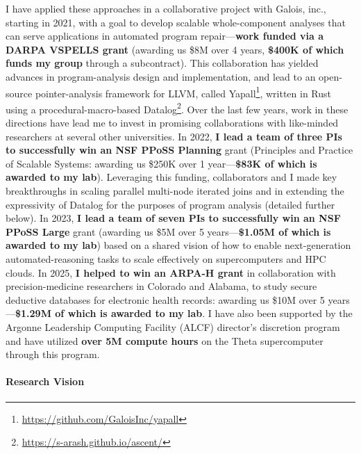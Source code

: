 \documentclass[12pt]{article}
\begin{document}
I have applied these approaches in a collaborative project with Galois, inc., starting in 2021, with a goal to develop scalable whole-component analyses that can serve applications in automated program repair---\textbf{work funded via a DARPA VSPELLS grant} (awarding us \$8M over 4 years, \textbf{\$400K of which funds my group} through a subcontract). This collaboration has yielded advances in program-analysis design and implementation, and lead to an open-source pointer-analysis framework for LLVM, called Yapall\footnote{\url{https://github.com/GaloisInc/yapall}}, written in Rust using a procedural-macro-based Datalog\footnote{\url{https://s-arash.github.io/ascent/}}.
Over the last few years, work in these directions have lead me to invest in promising collaborations with like-minded researchers at several other universities.
In 2022, \textbf{I lead a team of three PIs to successfully win an NSF PPoSS Planning} grant (Principles and Practice of Scalable Systems: awarding us \$250K over 1 year---\textbf{\$83K of which is awarded to my lab}). Leveraging this funding, collaborators and I made key breakthroughs in scaling parallel multi-node iterated joins and in extending the expressivity of Datalog for the purposes of program analysis (detailed further below). 
In 2023, \textbf{I lead a team of seven PIs to successfully win an NSF PPoSS Large} grant (awarding us \$5M over 5 years---\textbf{\$1.05M of which is awarded to my lab}) based on a shared vision of how to enable next-generation automated-reasoning tasks to scale effectively on supercomputers and HPC clouds.
In 2025, \textbf{I helped to win an ARPA-H grant} in collaboration with precision-medicine researchers in Colorado and Alabama, to study secure deductive databases for electronic health records: awarding us \$10M over 5 years---\textbf{\$1.29M of which is awarded to my lab}. I have also been supported by the Argonne Leadership Computing Facility (ALCF) director's discretion program and have utilized \textbf{over 5M compute hours} on the Theta supercomputer through this program.   


\paragraph{Research Vision}
\end{document}
